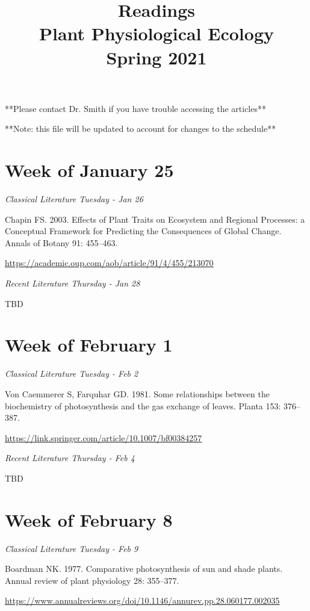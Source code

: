 \documentclass[12pt, notitlepage]{article}   	%
\title{
	\textbf{
		Readings
	} \\
	\large Plant Physiological Ecology \\
	\large Spring 2021
}
\date{\vspace{-5ex}}
\begin{document}
{\selectfont %

\maketitle

**Please contact Dr. Smith if you have trouble accessing the articles**

**Note: this file will be updated to account for changes to the schedule**

\section*{Week of January 25}
\textit{Classical Literature Tuesday - Jan 26} \par
Chapin FS. 2003. Effects of Plant Traits on Ecosystem and Regional Processes: 
a Conceptual Framework for Predicting the Consequences of Global Change. 
Annals of Botany 91: 455–463. \par
\url{https://academic.oup.com/aob/article/91/4/455/213070}

\textit{Recent Literature Thursday - Jan 28} \par
TBD \par

\section*{Week of February 1}
\textit{Classical Literature Tuesday - Feb 2} \par
Von Caemmerer S, Farquhar GD. 1981. Some relationships between the biochemistry of 
photosynthesis and the gas exchange of leaves. Planta 153: 376–387. \par
\url{https://link.springer.com/article/10.1007/bf00384257}

\textit{Recent Literature Thursday - Feb 4} \par
TBD \par

\section*{Week of February 8}
\textit{Classical Literature Tuesday - Feb 9} \par
Boardman NK. 1977. Comparative photosynthesis of sun and shade plants. 
Annual review of plant physiology 28: 355–377. \par
\url{https://www.annualreviews.org/doi/10.1146/annurev.pp.28.060177.002035}

}
\end{document}
